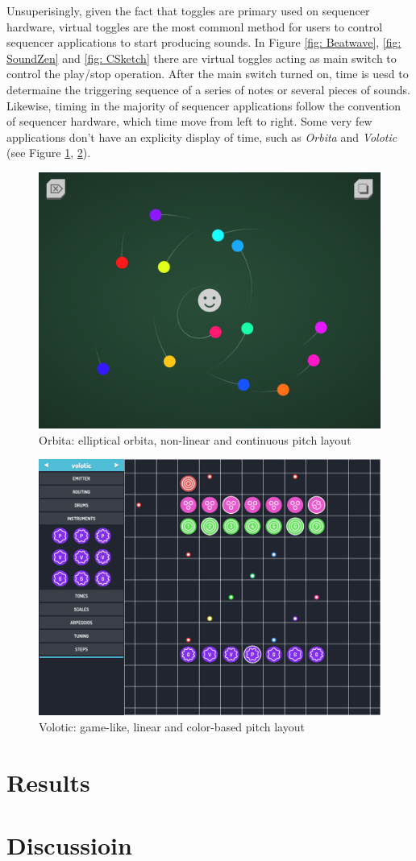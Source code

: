 Unsuperisingly, given the fact that toggles are primary used on sequencer hardware, virtual toggles are the most commonl method for users to control sequencer applications to start producing sounds. In Figure \ref{fig: Beatwave}, \ref{fig: SoundZen} and \ref{fig: CSketch} there are virtual toggles acting as main switch to control the play/stop operation. After the main switch turned on, time is uesd to determaine the triggering sequence of a series of notes or several pieces of sounds. Likewise, timing in the majority of sequencer applications follow the convention of sequencer hardware, which time move from left to right. Some very few applications don't have an explicity display of time, such as \textit{Orbita} and \textit{Volotic} (see Figure \ref{fig: Orbita}, \ref{fig: Volotic}).

\bigskip
\begin{figure}[h]
  \includegraphics[width=12 cm]{images/Orbita.PNG}
  \centering
  \caption{Orbita: elliptical orbita, non-linear and continuous pitch layout}
  \label{fig: Orbita}
\end{figure}
\bigskip



\newpage
\bigskip
\begin{figure}
  \includegraphics[width=12 cm]{images/Volotic.PNG}
  \centering
  \caption{Volotic: game-like, linear and color-based pitch layout}
  \label{fig: Volotic}
\end{figure}
\bigskip

\section{Results}
\label{sec: result}

\section{Discussioin}

